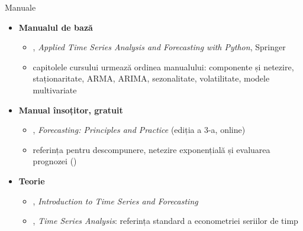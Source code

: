 \begin{frame}{Manuale}
\itemsize{\small}
\begin{itemize}
    \item \textbf{Manualul de bază}
    \begin{itemize}
        \item {}, \emph{Applied Time Series Analysis and Forecasting with Python}, Springer
        \item capitolele cursului urmează ordinea manualului: componente și netezire, staționaritate, ARMA, ARIMA, sezonalitate, volatilitate, modele multivariate
    \end{itemize}
    \item \textbf{Manual însoțitor, gratuit}
    \begin{itemize}
        \item {}, \emph{Forecasting: Principles and Practice} (ediția a 3-a, online)
        \item referința pentru descompunere, netezire exponențială și evaluarea prognozei ()
    \end{itemize}
    \item \textbf{Teorie}
    \begin{itemize}
        \item {}, \emph{Introduction to Time Series and Forecasting}
        \item {}, \emph{Time Series Analysis}: referința standard a econometriei seriilor de timp
    \end{itemize}
\end{itemize}
\end{frame}

